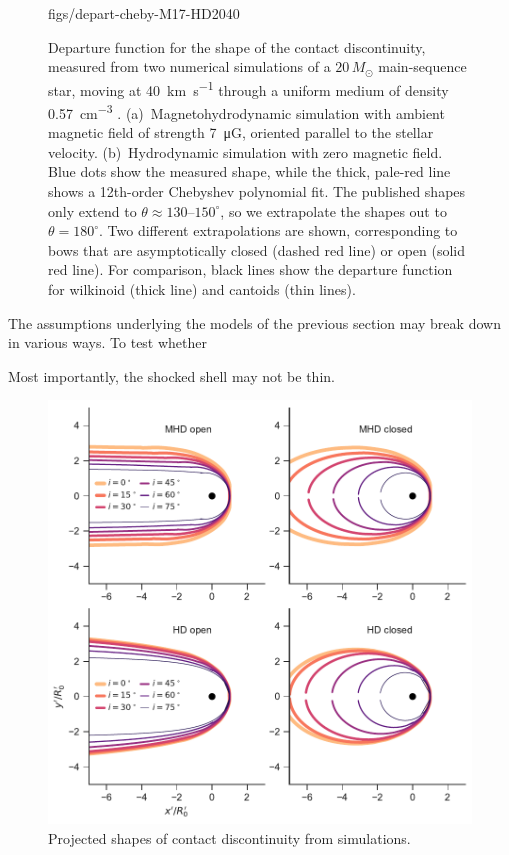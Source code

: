 \begin{figure}
  {figs/depart-cheby-M17-HD2040}\\[-\baselineskip]
  \caption{Departure function for the shape of the contact
    discontinuity, measured from two numerical simulations of a
    \(20\,M_\odot\) main-sequence star, moving at \SI{40}{km.s^{-1}}
    through a uniform medium of density \SI{0.57}{cm^{-3}}
    \citep{Meyer:2017a}. (a)~Magnetohydrodynamic simulation with
    ambient magnetic field of strength \SI{7}{\micro G}, oriented
    parallel to the stellar velocity. (b)~Hydrodynamic simulation with
    zero magnetic field.  Blue dots show the measured shape, while the
    thick, pale-red line shows a 12th-order Chebyshev polynomial fit.
    The published shapes only extend to
    \(\theta \approx 130\)--\(150^\circ\), so we extrapolate the shapes out to
    \(\theta = 180^\circ\). Two different extrapolations are shown,
    corresponding to bows that are asymptotically closed (dashed red
    line) or open (solid red line).  For comparison, black lines show
    the departure function for wilkinoid (thick line) and cantoids
    (thin lines).}
  \label{fig:sim-depart}
\end{figure}

The assumptions underlying the models of the previous section may
break down in various ways.  To test whether 


Most importantly, the shocked shell may not be thin.  

\begin{figure}
  \centering
  \includegraphics[width=\linewidth]{figs/test_xyprime_simulation}
  \caption{Projected shapes of contact discontinuity from simulations.}
  \label{fig:sim-xyp}
\end{figure}

